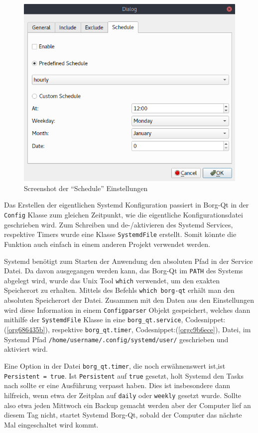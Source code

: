 \begin{figure}
\centering
\includegraphics[width=.9\linewidth]{pictures/borgqt_settings_schedule.png}
\caption{\label{fig:orga59a60c}
Screenshot der "`Schedule"' Einstellungen}
\end{figure}

Das Erstellen der eigentlichen Systemd Konfiguration passiert in Borg-Qt in der
\texttt{Config} Klasse zum gleichen Zeitpunkt, wie die eigentliche Konfigurationsdatei
geschrieben wird. Zum Schreiben und de-/aktivieren des Systemd Services,
respektive Timers wurde eine Klasse \texttt{SystemdFile} erstellt. Somit könnte
die Funktion auch einfach in einem anderen Projekt verwendet werden.

\newpage
Systemd benötigt zum Starten der Anwendung den absoluten Pfad in der Service
Datei. Da davon ausgegangen werden kann, das Borg-Qt im \texttt{PATH} des Systems
abgelegt wird, wurde das Unix Tool \texttt{which} verwendet, um den exakten Speicherort
zu erhalten. Mittels des Befehls \texttt{which borg-qt} erhält man den absoluten
Speicherort der Datei. Zusammen mit den Daten aus den Einstellungen wird diese
Information in einem \texttt{Configparser} Objekt gespeichert, welches dann mithilfe
der \texttt{SystemdFile} Klasse in eine \texttt{borg\_qt.service},
Codesnippet:(\ref{org686435b}), respektive \texttt{borg\_qt.timer},\newline
Codesnippet:(\ref{orgc9b6ece}), Datei, im Systemd Pfad
\texttt{/home/username/.config/systemd/user/} geschrieben und aktiviert wird.

Eine Option in der Datei \texttt{borg\_qt.timer}, die noch erwähnenswert ist,\newline ist
\texttt{Persistent = true}. Ist \texttt{Persistent} auf \texttt{true} gesetzt, holt Systemd den
Tasks nach sollte er eine Ausführung verpasst haben. Dies ist insbesondere dann
hilfreich, wenn etwa der Zeitplan auf \texttt{daily} oder \texttt{weekly} gesetzt wurde.
Sollte also etwa jeden Mittwoch ein Backup gemacht werden aber der Computer
lief an diesem Tag nicht, startet Systemd Borg-Qt, sobald der Computer das
nächste Mal eingeschaltet wird kommt.

